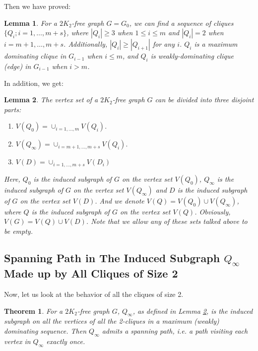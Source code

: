 \documentclass[12pt]{article}
\newtheorem{theorem}{Theorem}
\newtheorem{lemma}{Lemma}
\begin{document}
Then we have proved:
\begin{lemma}\label{lm5}
For a $2K_2$-free graph $G=G_0$, we can find a sequence of cliques $\{Q_i;i=1,\ldots,m+s\}$, where $|Q_i|\ge3$ when $1\le i\le m$ and $|Q_i|=2$ when $i=m+1,\ldots,m+s$. Additionally, $|Q_i|\ge|Q_{i+1}|$ for any $i$. $Q_i$ is a maximum dominating clique in $G_{i-1}$ when $i\le m$, and $Q_i$ is weakly-dominating clique (edge) in $G_{i-1}$ when $i>m$.
\end{lemma}


In addition, we get:

\begin{lemma}\label{lm6}
The vertex set of a $2K_2$-free graph $G$ can be divided into three disjoint parts:
\begin{enumerate}
\item $V(Q_0)=\cup_{i=1,\ldots,m}V(Q_i).$
\item $V(Q_{\infty})=\cup_{i=m+1,\ldots,m+s}V(Q_i).$
\item $V(D)=\cup_{i=1,\ldots,m+s}V(D_i)$
\end{enumerate}
Here, $Q_0$ is the induced subgraph of $G$ on the vertex set $V(Q_0)$, $Q_{\infty}$ is the induced subgraph of $G$ on the vertex set $V(Q_{\infty})$ and $D$ is the induced subgraph of $G$ on the vertex set $V(D)$. And we denote $V(Q)=V(Q_0)\cup V(Q_{\infty})$, where $Q$ is the induced subgraph of $G$ on the vertex set $V(Q)$. Obviously, $V(G)=V(Q)\cup V(D)$. Note that we allow any of these sets talked above to be empty.
\end{lemma}








\subsection{Spanning Path in The Induced Subgraph $Q_{\infty}$ Made up by All Cliques of Size 2}
Now, let us look at the behavior of all the cliques of size 2.
\begin{theorem}\label{thm4}
For a $2K_2$-free graph $G$, $Q_{\infty}$, as defined in Lemma \ref{lm6}, is the induced subgraph on all the vertices of all the 2-cliques in a maximum (weakly) dominating sequence. 
Then $Q_{\infty}$ admits a spanning path, i.e. a path visiting each vertex in $Q_{\infty}$ exactly once.
\end{theorem}
\end{document}
